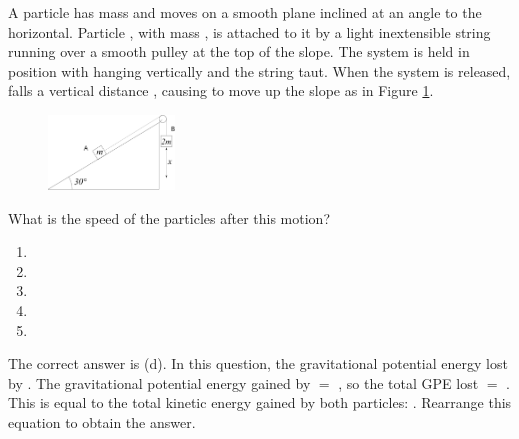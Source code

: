 
\begin{problem} 
{A particle  has mass  and moves on a smooth plane inclined at an angle  to the horizontal. Particle , with mass , is attached to it by a light inextensible string running over a smooth pulley at the top of the slope. The system is held in position with  hanging vertically and the string taut. When the system is released,  falls a vertical distance , causing  to move up the slope as in Figure \ref{fig:Dynamics_masses_slope_30}.
\begin{figure}[h]
	\centering
	\includegraphics[width=0.3\textwidth]{../../../figures/Dynamics_masses_slope_30.svg}
	\caption{}\label{fig:Dynamics_masses_slope_30}
\end{figure}
\nl
What is the speed of the particles after this motion?
\begin{enumerate}
	\item {}
	\item {}
	\item {}
	\item {} \answer
	\item {}
\end{enumerate}
}
{}
{The correct answer is (d). In this question, the gravitational potential energy lost by . The gravitational potential energy gained by  $=$ , so the total GPE lost $=$ . This is equal to the total kinetic energy gained by both particles: . Rearrange this equation to obtain the answer.
}
\end{problem}